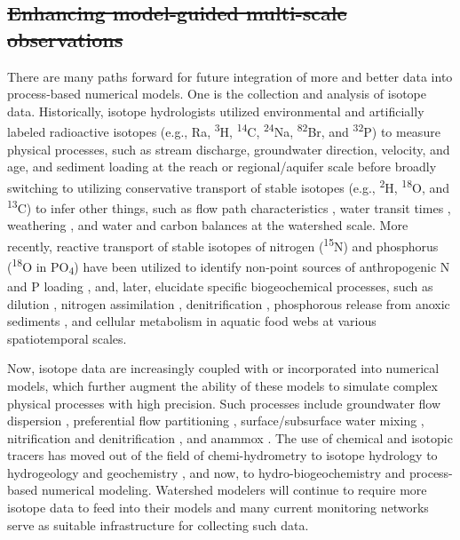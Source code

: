 \documentclass[preprint,review, 12pt]{elsarticle}
\providecommand{\DIFadd}[1]{{\protect\color{blue}\uwave{#1}}} %
\providecommand{\DIFdel}[1]{{\protect\color{red}\sout{#1}}}                      %
\providecommand{\DIFaddbegin}{} %
\providecommand{\DIFaddend}{} %
\providecommand{\DIFdelbegin}{} %
\providecommand{\DIFdelend}{} %
\newcommand{\DIFscaledelfig}{0.5}
\newlength{\DIFdelgraphicswidth} %
\newlength{\DIFdelgraphicsheight} %
\newcommand{\DIFaddincludegraphics}[2][]{{\color{blue}\fbox{\DIFOincludegraphics[#1]{#2}}}} %
\newcommand{\DIFdelincludegraphics}[2][]{%
\sbox{\DIFdelgraphicsbox}{\DIFOincludegraphics[#1]{#2}}%
\settoboxwidth{\DIFdelgraphicswidth}{\DIFdelgraphicsbox} %
\settoboxtotalheight{\DIFdelgraphicsheight}{\DIFdelgraphicsbox} %
\scalebox{\DIFscaledelfig}{%
\parbox[b]{\DIFdelgraphicswidth}{\usebox{\DIFdelgraphicsbox}\\[-\baselineskip] \rule{\DIFdelgraphicswidth}{0em}}\llap{\resizebox{\DIFdelgraphicswidth}{\DIFdelgraphicsheight}{%
\setlength{\unitlength}{\DIFdelgraphicswidth}%
\begin{picture}(1,1)%
\thicklines\linethickness{2pt} %
{\color[rgb]{1,0,0}\put(0,0){\framebox(1,1){}}}%
{\color[rgb]{1,0,0}\put(0,0){\line( 1,1){1}}}%
{\color[rgb]{1,0,0}\put(0,1){\line(1,-1){1}}}%
\end{picture}%
}\hspace*{3pt}}} %
} %
\DeclareRobustCommand{\DIFaddbegin}{\DIFOaddbegin \let\includegraphics\DIFaddincludegraphics} %
\DeclareRobustCommand{\DIFaddend}{\DIFOaddend \let\includegraphics\DIFOincludegraphics} %
\DeclareRobustCommand{\DIFdelbegin}{\DIFOdelbegin \let\includegraphics\DIFdelincludegraphics} %
\DeclareRobustCommand{\DIFdelend}{\DIFOaddend \let\includegraphics\DIFOincludegraphics} %
\begin{document}
\subsection{\DIFdelbegin \DIFdel{Enhancing model-guided multi-scale observations}\DIFdelend \DIFaddbegin \DIFadd{Opportunities for data-model co-design}\DIFaddend }
There are many paths forward for future integration of more and better data into process-based numerical models. One is the collection and analysis of isotope data. Historically, isotope hydrologists utilized environmental and artificially labeled radioactive isotopes (e.g., Ra, \textsuperscript{3}H, \textsuperscript{14}C, \textsuperscript{24}Na, \textsuperscript{82}Br, and \textsuperscript{32}P) to measure physical processes, such as stream discharge, groundwater direction, velocity, and age, and sediment loading at the reach or regional/aquifer scale \citep{Joly1922, Agency1963, Agency1967} before broadly switching to utilizing conservative transport of stable isotopes (e.g., \textsuperscript{2}H, \textsuperscript{18}O, and \textsuperscript{13}C) to infer other things, such as flow path characteristics \citep{Klaus2013}, water transit times \citep{McGuire2006}, weathering \citep{Schulte2011}, and water \citep{Agency} and carbon \citep{Dawson2011} balances at the watershed scale. More recently, reactive transport of stable isotopes of nitrogen (\textsuperscript{15}N) and phosphorus (\textsuperscript{18}O in PO\textsubscript{4}) have been utilized to identify non-point sources of anthropogenic N \citep{Fry1999, Lake2001, Spoelstra2001, Robinson2001, Mayer2002, M.JakeVanderZanden2005, Kendall2008, Savard2010, Nestler2011, Kaushal2011} and P loading \citep{McLaughlin2006, Elsbury2009, Paytan2012, Granger2017, Tonderski2017, Ishida2019}, and, later, elucidate specific biogeochemical processes, such as dilution \citep{Archana2018}, nitrogen assimilation \citep{Deutsch2009, Nikolenko2018}, denitrification \citep{Wexler2014}, phosphorous release from anoxic sediments \citep{Elsbury2009}, and cellular metabolism in aquatic food webs \citep{Davies2014} at various spatiotemporal scales.

Now, isotope data are increasingly coupled with or incorporated into numerical models, which further augment the ability of these models to simulate complex physical processes with high precision. Such processes include groundwater flow dispersion \citep{Cornaton2011, Jiang2019}, preferential flow partitioning \citep{VanderHoven2002, Dusek2018}, surface/subsurface water mixing \citep{Turner2006}, nitrification and denitrification \citep{Choi2003, Chen2004, Rutting2007}, and anammox \citep{Granger2016}. The use of chemical and isotopic tracers has moved out of the field of chemi-hydrometry \citep{Groat1915} to isotope hydrology \citep{Agency} to hydrogeology and geochemistry \citep{Agency1974}, and now, to hydro-biogeochemistry and process-based numerical modeling.  Watershed modelers will continue to require more isotope data to feed into their models and many current monitoring networks serve as suitable infrastructure for collecting such data. 
\end{document}
